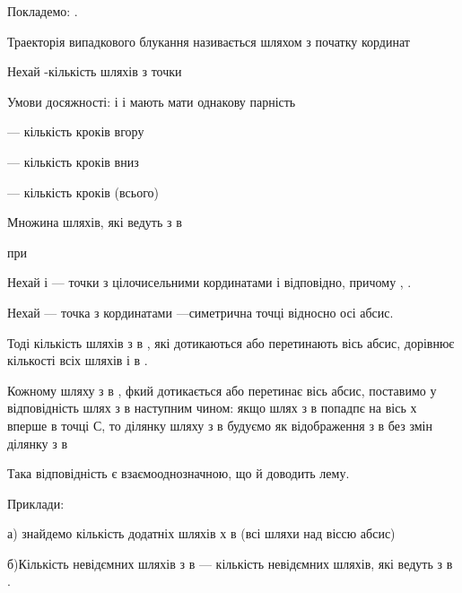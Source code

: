 Покладемо: .

Траекторія випадкового блукання називається шляхом з початку
кординат

Нехай  -кількість шляхів з точки

Умови досяжності:  і  і  мають мати однакову парність

--- кількість кроків вгору

--- кількість кроків вниз

--- кількість кроків (всього)



Множина шляхів, які ведуть з  в

\begin{remark}
    при 
\end{remark}

\begin{lemma}
    Нехай  і --- точки з цілочисельними кординатами  і  відповідно,
    причому  , .
\end{lemma}

Нехай  --- точка з кординатами  ---симетрична точці  відносно
осі абсис.

Тоді кількість шляхів з  в , які дотикаються або перетинають вісь 
абсис, дорівнює кількості всіх шляхів і  в  .


Кожному шляху з  в  , фкий дотикається або перетинає вісь абсис,
поставимо у відповідність шлях з  в  наступним чином:
якщо шлях з  в  попадпє на вісь х вперше в точці С, то ділянку
шляху з  в  будуємо як відображення з  в  без змін ділянку з 
в

Така відповідність є взаємооднозначною, що й доводить лему.

Приклади:

а) знайдемо кількість додатніх шляхів х  в  (всі шляхи над
віссю абсис)

б)Кількість невідємних шляхів з  в  
--- кількість невідємних шляхів, які ведуть з  в  .

